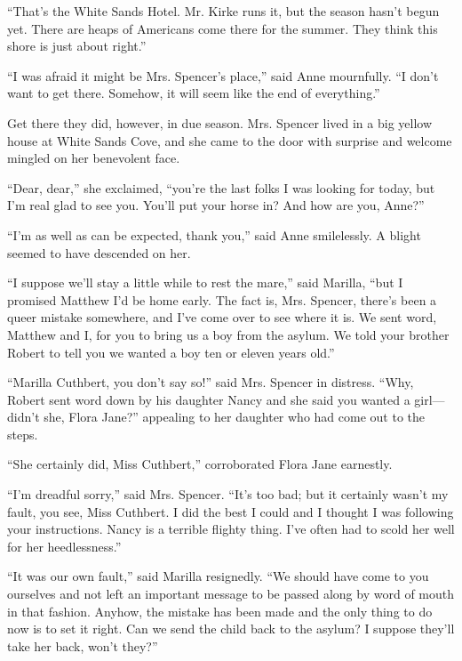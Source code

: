 \documentclass[a4paper]{article}
\begin{document}
``That's the White Sands Hotel. Mr. Kirke runs it, but the season hasn't begun yet. There are heaps of Americans come there for the summer. They think this shore is just about right.''

``I was afraid it might be Mrs. Spencer's place,'' said Anne mournfully. ``I don't want to get there. Somehow, it will seem like the end of everything.''


Get there they did, however, in due season. Mrs. Spencer lived in a big yellow house at White Sands Cove, and she came to the door with surprise and welcome mingled on her benevolent face.

``Dear, dear,'' she exclaimed, ``you're the last folks I was looking for today, but I'm real glad to see you. You'll put your horse in? And how are you, Anne?''

``I'm as well as can be expected, thank you,'' said Anne smilelessly. A blight seemed to have descended on her.

``I suppose we'll stay a little while to rest the mare,'' said Marilla, ``but I promised Matthew I'd be home early. The fact is, Mrs. Spencer, there's been a queer mistake somewhere, and I've come over to see where it is. We sent word, Matthew and I, for you to bring us a boy from the asylum. We told your brother Robert to tell you we wanted a boy ten or eleven years old.''

``Marilla Cuthbert, you don't say so!'' said Mrs. Spencer in distress. ``Why, Robert sent word down by his daughter Nancy and she said you wanted a girl---didn't she, Flora Jane?'' appealing to her daughter who had come out to the steps.

``She certainly did, Miss Cuthbert,'' corroborated Flora Jane earnestly.

``I'm dreadful sorry,'' said Mrs. Spencer. ``It's too bad; but it certainly wasn't my fault, you see, Miss Cuthbert. I did the best I could and I thought I was following your instructions. Nancy is a terrible flighty thing. I've often had to scold her well for her heedlessness.''

``It was our own fault,'' said Marilla resignedly. ``We should have come to you ourselves and not left an important message to be passed along by word of mouth in that fashion. Anyhow, the mistake has been made and the only thing to do now is to set it right. Can we send the child back to the asylum? I suppose they'll take her back, won't they?''
\end{document}
